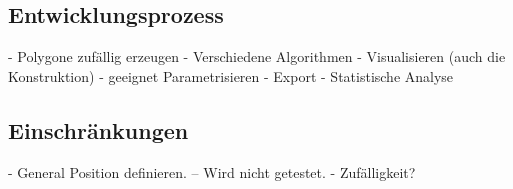 \subsection{Entwicklungsprozess}


- Polygone zufällig erzeugen
- Verschiedene Algorithmen
- Visualisieren (auch die Konstruktion)
- geeignet Parametrisieren
- Export
- Statistische Analyse

\subsection{Einschränkungen}

- General Position definieren.
-- Wird nicht getestet.
- Zufälligkeit?

